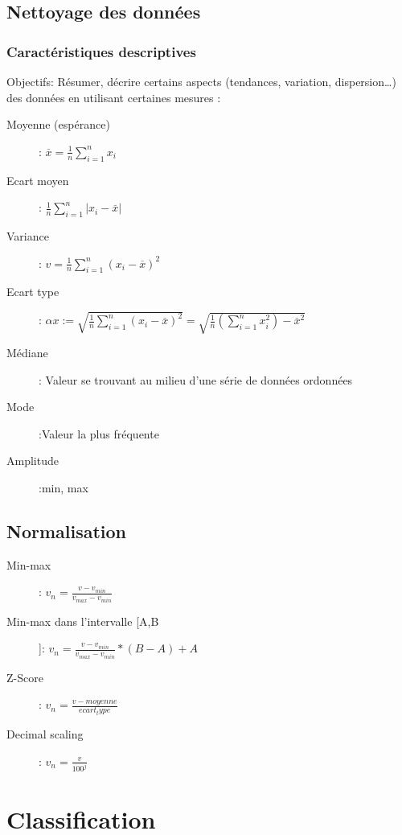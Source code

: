 \section{Nettoyage des données}
\subsection{Caractéristiques descriptives}

Objectifs: Résumer, décrire certains aspects (tendances, variation, dispersion…) des données en utilisant certaines mesures :

\begin{center}
\begin{description}
\item[Moyenne (espérance)]: $\overset{\_}{x}=\frac{1}{n} \sum_{i=1}^n x_i$
\item[Ecart moyen]: $\frac{1}{n} \sum_{i=1}^n |x_i - \overset{\_}{x} |$
\item[Variance]: $v = \frac{1}{n} \sum_{i=1}^n (x_i - \overset{\_}{x} )^2$
\item[Ecart type]: $\alpha x := \sqrt{\frac{1}{n} \sum_{i=1}^n (x_i - \overset{\_}{x} )^2} = \sqrt{\frac{1}{n}(\sum_{i=1}^n x_i^2) - \overset{\_}{x}^2 }$
\item[Médiane]: Valeur se trouvant au milieu d’une série de données ordonnées
\item[Mode]:Valeur la plus fréquente 
\item[Amplitude]:min, max
\end{description}
\end{center}

\section{Normalisation}

\begin{description}
\item[Min-max]: $v_n = \frac{v-v_{min}}{v_{max} - v_{min}}$
\item[Min-max dans l'intervalle [A,B]]: $v_n = \frac{v-v_{min}}{v_{max} - v_{min}} * (B-A) + A$
\item[Z-Score]: $v_n = \frac{v - moyenne}{ecart_type}$
\item[Decimal scaling]: $v_n = \frac{v}{100^j}$
\end{description}

\pagebreak
\chapter{Classification}
